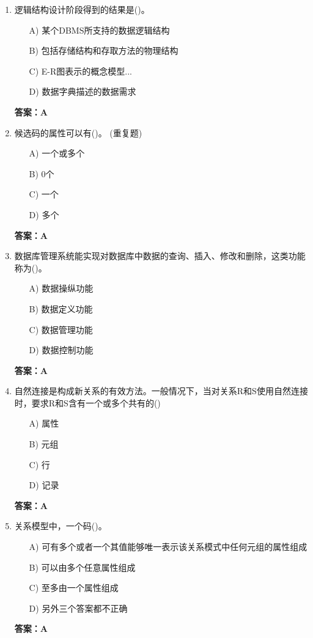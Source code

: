 \documentclass[a4paper,12pt]{article}
\begin{document}
\begin{enumerate}[label=\arabic*.]
\item 逻辑结构设计阶段得到的结果是()。
\begin{itemize}
    \item[A)] 某个DBMS所支持的数据逻辑结构
    \item[B)] 包括存储结构和存取方法的物理结构
    \item[C)] E-R图表示的概念模型...
    \item[D)] 数据字典描述的数据需求
\end{itemize}
\textbf{答案：A}

\item 候选码的属性可以有()。 (重复题)
\begin{itemize}
    \item[A)] 一个或多个
    \item[B)] 0个
    \item[C)] 一个
    \item[D)] 多个
\end{itemize}
\textbf{答案：A}

\item 数据库管理系统能实现对数据库中数据的查询、插入、修改和删除，这类功能称为()。
\begin{itemize}
    \item[A)] 数据操纵功能
    \item[B)] 数据定义功能
    \item[C)] 数据管理功能
    \item[D)] 数据控制功能
\end{itemize}
\textbf{答案：A}

\item 自然连接是构成新关系的有效方法。一般情况下，当对关系R和S使用自然连接时，要求R和S含有一个或多个共有的()
\begin{itemize}
    \item[A)] 属性
    \item[B)] 元组
    \item[C)] 行
    \item[D)] 记录
\end{itemize}
\textbf{答案：A}

\item 关系模型中，一个码()。
\begin{itemize}
    \item[A)] 可有多个或者一个其值能够唯一表示该关系模式中任何元组的属性组成
    \item[B)] 可以由多个任意属性组成
    \item[C)] 至多由一个属性组成
    \item[D)] 另外三个答案都不正确
\end{itemize}
\textbf{答案：A}


\end{enumerate}
\end{document}
